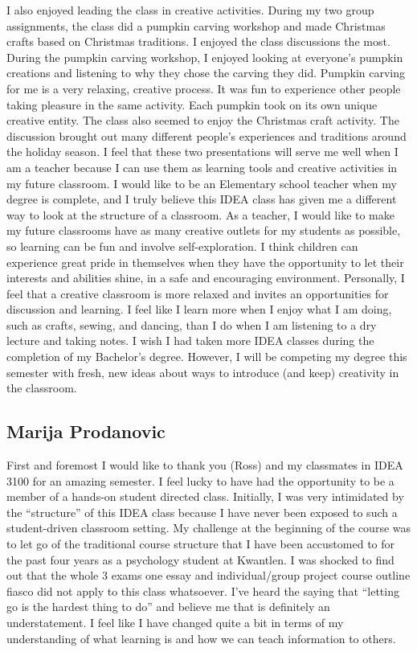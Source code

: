 \documentclass[letterpaper,10pt,headsepline]{scrreprt}
\begin{document}
I also enjoyed leading the class in creative activities. During my two group assignments, the class did a pumpkin carving workshop and made Christmas crafts based on Christmas traditions. I enjoyed the class discussions the most. During the pumpkin carving workshop, I enjoyed looking at everyone’s pumpkin creations and listening to why they chose the carving they did. Pumpkin carving for me is a very relaxing, creative process. It was fun to experience other people taking pleasure in the same activity. Each pumpkin took on its own unique creative entity. The class also seemed to enjoy the Christmas craft activity. The discussion brought out many different people’s experiences and traditions around the holiday season. I feel that these two presentations will serve me well when I am a teacher because I can use them as learning tools and creative activities in my future classroom.  
I would like to be an Elementary school teacher when my degree is complete, and I truly believe this IDEA class has given me a different way to look at the structure of a classroom. As a teacher, I would like to make my future classrooms have as many creative outlets for my students as possible, so learning can be fun and involve self-exploration. I think children can experience great pride in themselves when they have the opportunity to let their interests and abilities shine, in a safe and encouraging environment. Personally, I feel that a creative classroom is more relaxed and invites an opportunities for discussion and learning. I feel like I learn more when I enjoy what I am doing, such as crafts, sewing, and dancing, than I do when I am listening to a dry lecture and taking notes. I wish I had taken more IDEA classes during the completion of my Bachelor’s degree. However, I will be competing my degree this semester with fresh, new ideas about ways to introduce (and keep) creativity in the classroom.

\subsection{Marija Prodanovic}

First and foremost I would like to thank you (Ross) and my classmates in IDEA 3100 for an amazing semester. I feel lucky to have had the opportunity to be a member of a hands-on student directed class. Initially, I was very intimidated by the “structure” of this IDEA class because I have never been exposed to such a student-driven classroom setting. My challenge at the beginning of the course was to let go of the traditional course structure that I have been accustomed to for the past four years as a psychology student at Kwantlen. I was shocked to find out that the whole 3 exams one essay and individual/group project course outline fiasco did not apply to this class whatsoever. I’ve heard the saying that “letting go is the hardest thing to do” and believe me that is definitely an understatement. I feel like I have changed quite a bit in terms of my understanding of what learning is and how we can teach information to others.
\end{document}
